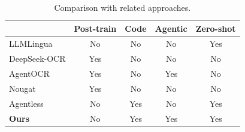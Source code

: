 \begin{table}[t]
\centering
\caption{Comparison with related approaches.}
\label{tab:related-work}
\small
\begin{tabular}{p{1.8cm}cccc}
\toprule
& \textbf{Post-train} & \textbf{Code} & \textbf{Agentic} & \textbf{Zero-shot} \\
\midrule
LLMLingua \cite{jiang2023llmlingua}       & No  & No  & No  & Yes \\
DeepSeek-OCR \cite{wei2025deepseekocr}    & Yes & No  & No  & No  \\
AgentOCR \cite{feng2026agentocr}          & Yes & No  & Yes & No  \\
Nougat \cite{blecher2023nougat}           & Yes & No  & No  & No  \\
Agentless \cite{xia2024agentless}         & No  & Yes & No  & Yes \\
\textbf{Ours}                             & No  & Yes & Yes & Yes \\
\bottomrule
\end{tabular}
\end{table}
